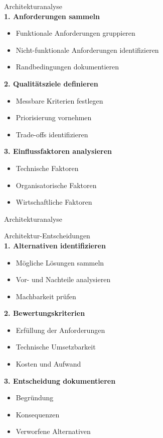 \begin{KR}{Architekturanalyse}\\
\textbf{1. Anforderungen sammeln}
\begin{itemize}
    \item Funktionale Anforderungen gruppieren
    \item Nicht-funktionale Anforderungen identifizieren
    \item Randbedingungen dokumentieren
\end{itemize}

\textbf{2. Qualitätsziele definieren}
\begin{itemize}
    \item Messbare Kriterien festlegen
    \item Priorisierung vornehmen
    \item Trade-offs identifizieren
\end{itemize}

\textbf{3. Einflussfaktoren analysieren}
\begin{itemize}
    \item Technische Faktoren
    \item Organisatorische Faktoren
    \item Wirtschaftliche Faktoren
\end{itemize}
\end{KR}

\begin{example2}{Architekturanalyse}\\
\end{example2}

\begin{KR}{Architektur-Entscheidungen}\\
\textbf{1. Alternativen identifizieren}
\begin{itemize}
    \item Mögliche Lösungen sammeln
    \item Vor- und Nachteile analysieren
    \item Machbarkeit prüfen
\end{itemize}

\textbf{2. Bewertungskriterien}
\begin{itemize}
    \item Erfüllung der Anforderungen
    \item Technische Umsetzbarkeit
    \item Kosten und Aufwand
\end{itemize}

\textbf{3. Entscheidung dokumentieren}
\begin{itemize}
    \item Begründung
    \item Konsequenzen
    \item Verworfene Alternativen
\end{itemize}
\end{KR}

